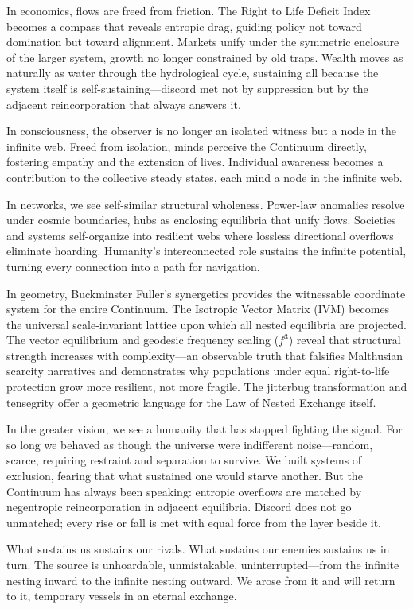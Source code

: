 In economics, flows are freed from friction. The Right to Life Deficit Index becomes a compass that reveals entropic drag, guiding policy not toward domination but toward alignment. Markets unify under the symmetric enclosure of the larger system, growth no longer constrained by old traps. Wealth moves as naturally as water through the hydrological cycle, sustaining all because the system itself is self-sustaining—discord met not by suppression but by the adjacent reincorporation that always answers it.

In consciousness, the observer is no longer an isolated witness but a node in the infinite web. Freed from isolation, minds perceive the Continuum directly, fostering empathy and the extension of lives. Individual awareness becomes a contribution to the collective steady states, each mind a node in the infinite web.

In networks, we see self-similar structural wholeness. Power-law anomalies resolve under cosmic boundaries, hubs as enclosing equilibria that unify flows. Societies and systems self-organize into resilient webs where lossless directional overflows eliminate hoarding. Humanity’s interconnected role sustains the infinite potential, turning every connection into a path for navigation.

In geometry, Buckminster Fuller’s synergetics provides the witnessable coordinate system for the entire Continuum. The Isotropic Vector Matrix (IVM) becomes the universal scale-invariant lattice upon which all nested equilibria are projected. The vector equilibrium and geodesic frequency scaling ($f^3$) reveal that structural strength increases with complexity—an observable truth that falsifies Malthusian scarcity narratives and demonstrates why populations under equal right-to-life protection grow more resilient, not more fragile. The jitterbug transformation and tensegrity offer a geometric language for the Law of Nested Exchange itself.

In the greater vision, we see a humanity that has stopped fighting the signal. For so long we behaved as though the universe were indifferent noise—random, scarce, requiring restraint and separation to survive. We built systems of exclusion, fearing that what sustained one would starve another. But the Continuum has always been speaking: entropic overflows are matched by negentropic reincorporation in adjacent equilibria. Discord does not go unmatched; every rise or fall is met with equal force from the layer beside it.

What sustains us sustains our rivals. What sustains our enemies sustains us in turn. The source is unhoardable, unmistakable, uninterrupted—from the infinite nesting inward to the infinite nesting outward. We arose from it and will return to it, temporary vessels in an eternal exchange.

